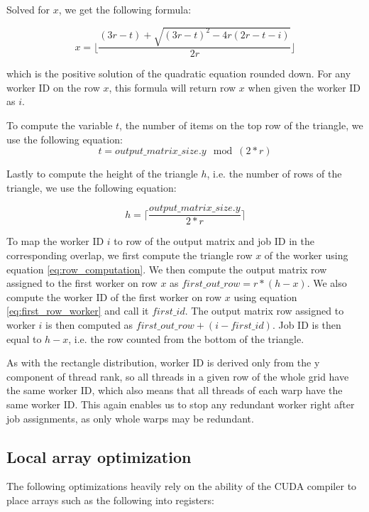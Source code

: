 Solved for $x$, we get the following formula:

\begin{equation}
\label{eq:row_computation}
	x = \lfloor \frac{(3r - t) + \sqrt{(3r - t)^2 - 4r(2r - t - i)}}{2r} \rfloor
\end{equation}

which is the positive solution of the quadratic equation rounded down. For any worker ID on the row $x$, this formula will return row $x$ when given the worker ID as $i$.

To compute the variable $t$, the number of items on the top row of the triangle, we use the following equation:
\begin{equation}
	t = output\_matrix\_size.y \mod (2*r)
\end{equation}

Lastly to compute the height of the triangle $h$, i.e. the number of rows of the triangle, we use the following equation:

\begin{equation}
	h = \lceil\frac{output\_matrix\_size.y}{2*r}\rceil
\end{equation}

To map the worker ID $i$ to row of the output matrix and job ID in the corresponding overlap, we first compute the triangle row $x$ of the worker using equation \ref{eq:row_computation}. We then compute the output matrix row assigned to the first worker on row $x$ as $first\_out\_row = r * (h - x)$. We also compute the worker ID of the first worker on row $x$ using equation \ref{eq:first_row_worker} and call it $first\_id$. The output matrix row assigned to worker $i$ is then computed as $first\_out\_row + (i - first\_id)$. Job ID is then equal to $h - x$, i.e. the row counted from the bottom of the triangle.

As with the rectangle distribution, worker ID is derived only from the y component of thread rank, so all threads in a given row of the whole grid have the same worker ID, which also means that all threads of each warp have the same worker ID. This again enables us to stop any redundant worker right after job assignments, as only whole warps may be redundant.


\subsection{Local array optimization}
\label{sec:local_array_optimization}

The following optimizations heavily rely on the ability of the CUDA compiler to place arrays such as the following into registers:

